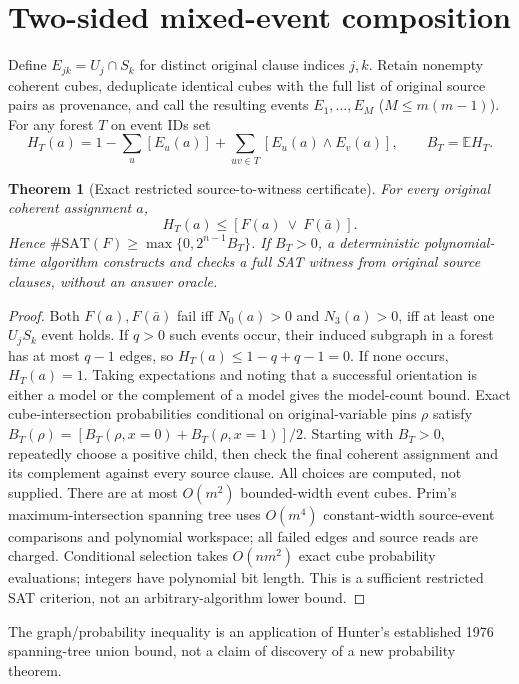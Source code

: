 \documentclass[10pt]{article}
\newtheorem{theorem}{Theorem}
\begin{document}
\section{Two-sided mixed-event composition}
Define $E_{jk}=U_j\cap S_k$ for distinct original clause indices $j,k$. Retain nonempty coherent cubes, deduplicate identical cubes with the full list of original source pairs as provenance, and call the resulting events $E_1,\dots,E_M$ ($M\le m(m-1)$). For any forest $T$ on event IDs set
\[
H_T(a)=1-\sum_u [E_u(a)]+\sum_{uv\in T}[E_u(a)\wedge E_v(a)],
\qquad B_T=\mathbb E H_T.
\]
\begin{theorem}[Exact restricted source-to-witness certificate]
For every original coherent assignment $a$,
\[
\boxed{H_T(a)\le [F(a)\ \lor\ F(\bar a)].}
\]
Hence $\#\mathrm{SAT}(F)\ge\max\{0,2^{n-1}B_T\}$. If $B_T>0$, a deterministic polynomial-time algorithm constructs and checks a full SAT witness from original source clauses, without an answer oracle.
\end{theorem}
\begin{proof}
Both $F(a),F(\bar a)$ fail iff $N_0(a)>0$ and $N_3(a)>0$, iff at least one $U_jS_k$ event holds. If $q>0$ such events occur, their induced subgraph in a forest has at most $q-1$ edges, so $H_T(a)\le1-q+q-1=0$. If none occurs, $H_T(a)=1$. Taking expectations and noting that a successful orientation is either a model or the complement of a model gives the model-count bound. Exact cube-intersection probabilities conditional on original-variable pins $\rho$ satisfy $B_T(\rho)=[B_T(\rho,x=0)+B_T(\rho,x=1)]/2$. Starting with $B_T>0$, repeatedly choose a positive child, then check the final coherent assignment and its complement against every source clause. All choices are computed, not supplied.
There are at most $O(m^2)$ bounded-width event cubes. Prim's maximum-intersection spanning tree uses $O(m^4)$ constant-width source-event comparisons and polynomial workspace; all failed edges and source reads are charged. Conditional selection takes $O(nm^2)$ exact cube probability evaluations; integers have polynomial bit length. This is a sufficient restricted SAT criterion, not an arbitrary-algorithm lower bound.
\end{proof}
The graph/probability inequality is an application of Hunter's established 1976 spanning-tree union bound, not a claim of discovery of a new probability theorem.
\end{document}
